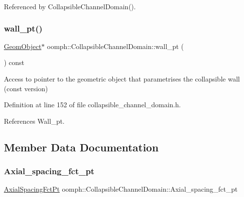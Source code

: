 Referenced by Collapsible\+Channel\+Domain().

\mbox{\label{classoomph_1_1CollapsibleChannelDomain_a48237d8c4d10ff3ccdf68d02da5b29c7}} 
\subsubsection{\texorpdfstring{wall\+\_\+pt()}{wall\_pt()}\hspace{0.1cm}{\footnotesize\ttfamily [2/2]}}
{\footnotesize\ttfamily \hyperlink{classoomph_1_1GeomObject}{Geom\+Object}$\ast$ oomph\+::\+Collapsible\+Channel\+Domain\+::wall\+\_\+pt (\begin{DoxyParamCaption}{ }\end{DoxyParamCaption}) const\hspace{0.3cm}{\ttfamily [inline]}}



Access to pointer to the geometric object that parametrises the collapsible wall (const version) 



Definition at line 152 of file collapsible\+\_\+channel\+\_\+domain.\+h.



References Wall\+\_\+pt.



\subsection{Member Data Documentation}
\mbox{\label{classoomph_1_1CollapsibleChannelDomain_a6f4c3319be685553715f5cd776eea0fc}} 
\subsubsection{\texorpdfstring{Axial\+\_\+spacing\+\_\+fct\+\_\+pt}{Axial\_spacing\_fct\_pt}}
{\footnotesize\ttfamily \hyperlink{classoomph_1_1CollapsibleChannelDomain_a317472dab112beac771ecf6442a465f5}{Axial\+Spacing\+Fct\+Pt} oomph\+::\+Collapsible\+Channel\+Domain\+::\+Axial\+\_\+spacing\+\_\+fct\+\_\+pt\hspace{0.3cm}{\ttfamily [private]}}



